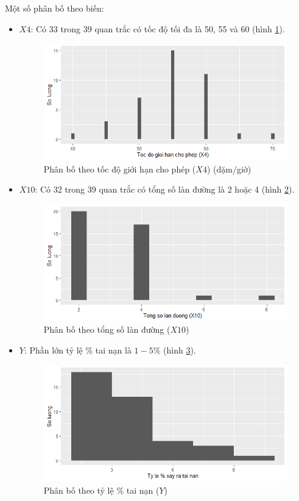 Một số phân bố theo biến:
\begin{itemize}
	\item $X4$: Có 33 trong 39 quan trắc có tốc độ tối đa là 50, 55 và 60 (hình \ref{fig-b3:plot-x4}).
	\begin{figure}[H]
		\centering
		\includegraphics[width=0.7\linewidth]{images/B3/plot-x4}
		\caption{Phân bố theo tốc độ giới hạn cho phép ($X4$) (dặm/giờ)}
		\label{fig-b3:plot-x4}
	\end{figure}
	\item $X10$: Có 32 trong 39 quan trắc có tổng số làn đường là 2 hoặc 4 (hình \ref{fig-b3:plot-x10}).
		\begin{figure}[H]
			\centering
			\includegraphics[width=0.7\linewidth]{images/B3/plot-x10}
			\caption{Phân bố theo tổng số làn đường ($X10$)}
			\label{fig-b3:plot-x10}
		\end{figure}
	\item $Y$: Phần lớn tỷ lệ \% tai nạn là $1-5\%$ (hình \ref{fig-b3:plot-y}).
		\begin{figure}[H]
			\centering
			\includegraphics[width=0.7\linewidth]{images/B3/plot-y}
			\caption{Phân bố theo tỷ lệ \% tai nạn ($Y$)}
			\label{fig-b3:plot-y}
		\end{figure}
\end{itemize}

